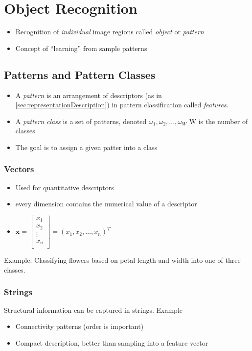 \section{Object Recognition}
\begin{itemize}
\item Recognition of \emph{individual} image regions called \emph{object} or \emph{pattern}
\item Concept of ``learning'' from sample patterns
\end{itemize}

\subsection{Patterns and Pattern Classes}
\begin{itemize}
	\item A \emph{pattern} is an arrangement of descriptors
		(as in \ref{sec:representationDescription}) in pattern classification
		called \emph{features}.
	\item A \emph{pattern class} is a set of patterns, denoted $\omega_1, \omega_2, ..., \omega_W$ W is the number of classes
	\item The goal is to assign a given patter into a class
\end{itemize}

\subsubsection{Vectors}
\begin{itemize}
	\item Used for quantitative descriptors
	\item every dimension contains the numerical value of a descriptor
	\item $\mathbf{x} =
		\begin{bmatrix}
			x_1 \\
			x_2 \\
			\vdots \\
			x_n \\
		\end{bmatrix}
		 = (x_1, x_2, \ldots, x_n)^T $
\end{itemize}
Example: Classifying flowers based on petal length and width into one of three
classes.

\subsubsection{Strings}
Structural information can be captured in strings. Example
\begin{itemize}
	\item Connectivity patterns (order is important)
	\item Compact description, better than sampling into a feature vector
\end{itemize}

